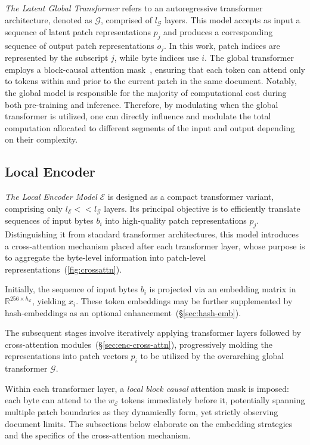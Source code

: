 \textit{The Latent Global Transformer} refers to an autoregressive transformer architecture, denoted as $\mathcal{G}$, comprised of $l_{\mathcal{G}}$ layers. This model accepts as input a sequence of latent patch representations $p_j$ and produces a corresponding sequence of output patch representations $o_j$. In this work, patch indices are represented by the subscript $j$, while byte indices use $i$. The global transformer employs a block-causal attention mask~\citep{dubey2024llama}, ensuring that each token can attend only to tokens within and prior to the current patch in the same document. Notably, the global model is responsible for the majority of computational cost during both pre-training and inference. Therefore, by modulating when the global transformer is utilized, one can directly influence and modulate the total computation allocated to different segments of the input and output depending on their complexity.

\subsection{Local Encoder}
\label{section:local}

\textit{The Local Encoder Model} $\mathcal{E}$ is designed as a compact transformer variant, comprising only $l_{\mathcal{E}} << l_{\mathcal{G}}$ layers. Its principal objective is to efficiently translate sequences of input bytes $b_i$ into high-quality patch representations $p_j$. Distinguishing it from standard transformer architectures, this model introduces a cross-attention mechanism placed after each transformer layer, whose purpose is to aggregate the byte-level information into patch-level representations~(\autoref{fig:crossattn}).

Initially, the sequence of input bytes $b_i$ is projected via an embedding matrix in $\mathbb{R}^{256 \times h_{\mathcal{E}}}$, yielding $x_i$. These token embeddings may be further supplemented by hash-embeddings as an optional enhancement~(\S\ref{sec:hash-emb}).

The subsequent stages involve iteratively applying transformer layers followed by cross-attention modules~(\S\ref{sec:enc-cross-attn}), progressively molding the representations into patch vectors $p_i$ to be utilized by the overarching global transformer $\mathcal{G}$.

Within each transformer layer, a \textit{local block causal} attention mask is imposed: each byte can attend to the $w_{\mathcal{E}}$ tokens immediately before it, potentially spanning multiple patch boundaries as they dynamically form, yet strictly observing document limits. The subsections below elaborate on the embedding strategies and the specifics of the cross-attention mechanism.

